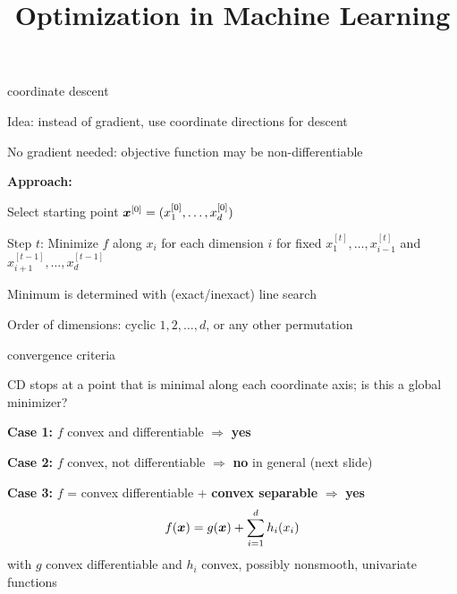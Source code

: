 \documentclass[11pt,compress,t,notes=noshow, xcolor=table]{beamer}
\title{Optimization in Machine Learning}
\begin{document}

\begin{framei}{coordinate descent}
\item Idea: instead of gradient, use coordinate directions for descent
\item No gradient needed: objective function may be non-differentiable
\vfill
\item[] \textbf{Approach:}
\item Select starting point $\bm{x}^{[0]} = (x^{[0]}_1, \ldots, x^{[0]}_d)$
\item Step $t$: Minimize $f$ along $x_i$ for each dimension $i$ for fixed $x^{[t]}_1, \ldots,x^{[t]}_{i-1}$ and $x^{[t-1]}_{i+1}, \ldots,x^{[t-1]}_d$
\item Minimum is determined with (exact/inexact) line search
\item Order of dimensions: cyclic $1, 2, \ldots, d$, or any other permutation
\end{framei}


\begin{framei}{convergence criteria}
\item CD stops at a point that is minimal along each coordinate axis;
is this a global minimizer?
\item[] \textbf{Case 1:} $f$ convex and differentiable $\Rightarrow$ \textbf{yes}
\item[] \textbf{Case 2:} $f$ convex, not differentiable $\Rightarrow$ \textbf{no} in general (next slide)
\item[] \textbf{Case 3:} $f$ = convex differentiable + \textbf{convex separable} $\Rightarrow$ \textbf{yes}
$$f(\bm{x}) = g(\bm{x}) + \sum_{i=1}^d h_i(x_i)$$
with $g$ convex differentiable and $h_i$ convex, possibly nonsmooth, univariate functions
\end{framei}
\end{document}
